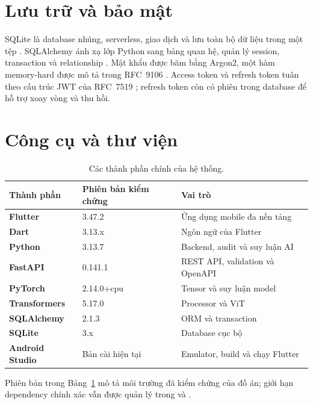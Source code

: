 \section{Lưu trữ và bảo mật}

SQLite là database nhúng, serverless, giao dịch và lưu toàn bộ dữ liệu trong
một tệp \cite{sqliteAbout}. SQLAlchemy ánh xạ lớp Python sang bảng quan hệ,
quản lý session, transaction và relationship \cite{sqlalchemyDocs}. Mật khẩu
được băm bằng Argon2, một hàm memory-hard được mô tả trong RFC~9106
\cite{rfc9106}. Access token và refresh token tuân theo cấu trúc JWT của
RFC~7519 \cite{rfc7519}; refresh token còn có phiên trong database để hỗ trợ
xoay vòng và thu hồi.

\section{Công cụ và thư viện}

\begin{table}[htbp]
\centering
\caption{Các thành phần chính của hệ thống.}
\label{tab:congcu}
\small
\begin{tabularx}{\textwidth}{>{\bfseries\color{daunavy}}l >{\color{daumaroon}}l X}
\toprule
\textbf{Thành phần} & \textbf{Phiên bản kiểm chứng} & \textbf{Vai trò} \\
\midrule
Flutter & 3.47.2 & Ứng dụng mobile đa nền tảng \\
Dart & 3.13.x & Ngôn ngữ của Flutter \\
Python & 3.13.7 & Backend, audit và suy luận AI \\
FastAPI & 0.141.1 & REST API, validation và OpenAPI \\
PyTorch & 2.14.0+cpu & Tensor và suy luận model \cite{paszke2019pytorch} \\
Transformers & 5.17.0 & Processor và ViT \cite{huggingfaceTransformers} \\
SQLAlchemy & 2.1.3 & ORM và transaction \\
SQLite & 3.x & Database cục bộ \\
Android Studio & Bản cài hiện tại & Emulator, build và chạy Flutter \\
\bottomrule
\end{tabularx}
\end{table}

Phiên bản trong Bảng~\ref{tab:congcu} mô tả môi trường đã kiểm chứng của đồ
án; giới hạn dependency chính xác vẫn được quản lý trong
 và .

